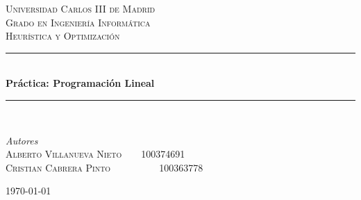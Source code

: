 \documentclass[11pt,spanish]{article}
\begin{document}



	\begin{titlepage} %
	
	\newcommand{\HRule}{\rule{\linewidth}{0.5mm}} %
	
	\center %
	
	
	\textsc{\LARGE Universidad Carlos III de Madrid}\\[1.5cm] %
	
	\textsc{\Large Grado en Ingeniería Informática}\\[0.5cm] %
	
	\textsc{\large Heurística y Optimización}\\[0.5cm] %
	
	
	\HRule\\[0.4cm]
	
	{\huge\bfseries Práctica: Programación Lineal}\\[0.4cm] %
	
	\HRule\\[1.5cm]
	
	
	\begin{minipage}{0.7\textwidth}
		\begin{flushleft}
			\large
			\textit{Autores}\\
			\textsc{Alberto Villanueva Nieto\ \ \ \ 100374691}\\
            \textsc{Cristian Cabrera Pinto\ \ \ \ \ \ \ \ \ \ 100363778}
		\end{flushleft}
	\end{minipage}

	
	\vfill\vfill\vfill %
	
	{\large\today} %
	
	\vfill %
	
	\end{titlepage}
	\newpage
	\tableofcontents
	\newpage
\end{document}
